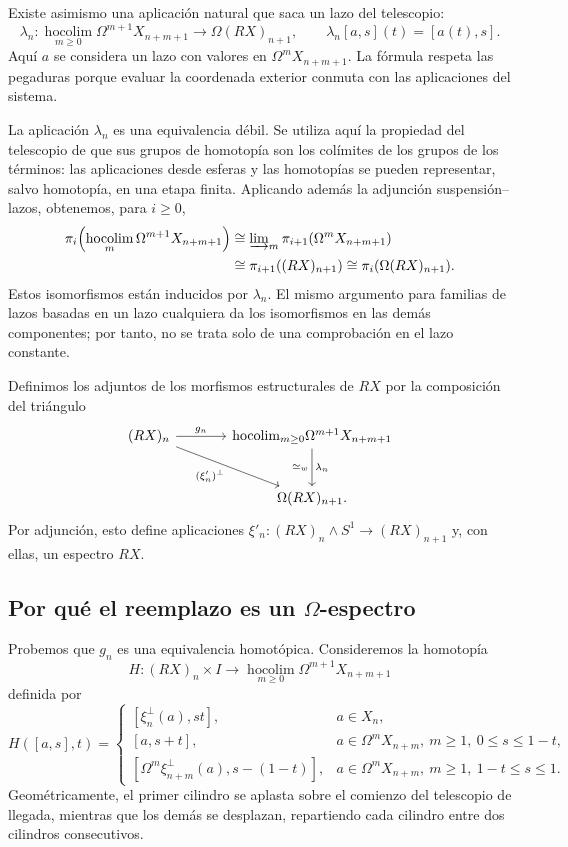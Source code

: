 Existe asimismo una aplicación natural que saca un lazo del telescopio:
\[
\lambda_n\colon
\operatorname*{hocolim}_{m\ge0}\Omega^{m+1}X_{n+m+1}
\longrightarrow\Omega(RX)_{n+1},
\qquad
\lambda_n[a,s](t)=[a(t),s].
\]
Aquí $a$ se considera un lazo con valores en $\Omega^mX_{n+m+1}$. La fórmula respeta las pegaduras porque evaluar la coordenada exterior conmuta con las aplicaciones del sistema.

La aplicación $\lambda_n$ es una equivalencia débil. Se utiliza aquí la propiedad del telescopio de que sus grupos de homotopía son los colímites de los grupos de los términos: las aplicaciones desde esferas y las homotopías se pueden representar, salvo homotopía, en una etapa finita. Aplicando además la adjunción suspensión--lazos, obtenemos, para $i\ge0$,
\[
\begin{aligned}
\pi_i\!\left(\operatorname*{hocolim}_m\Omega^{m+1}X_{n+m+1}\right)
&\cong\varinjlim\nolimits_m\pi_{i+1}(\Omega^mX_{n+m+1})\\
&\cong\pi_{i+1}((RX)_{n+1})
\cong\pi_i(\Omega(RX)_{n+1}).
\end{aligned}
\]
Estos isomorfismos están inducidos por $\lambda_n$. El mismo argumento para familias de lazos basadas en un lazo cualquiera da los isomorfismos en las demás componentes; por tanto, no se trata solo de una comprobación en el lazo constante.

Definimos los adjuntos de los morfismos estructurales de $RX$ por la composición del triángulo
\[
\begin{tikzcd}[column sep=large,row sep=large]
(RX)_n \arrow[r,"g_n"] \arrow[dr,"(\xi'_n)^{\perp}"']
& \smash[b]{\operatorname*{hocolim}_{m\ge0}}\Omega^{m+1}X_{n+m+1}
\arrow[d,"\lambda_n", "\simeq_w"']\\
& \Omega(RX)_{n+1}.
\end{tikzcd}
\]
Por adjunción, esto define aplicaciones $\xi'_n\colon(RX)_n\wedge S^1\to(RX)_{n+1}$ y, con ellas, un espectro $RX$.

\subsection{Por qué el reemplazo es un \texorpdfstring{$\Omega$}{Omega}-espectro}

Probemos que $g_n$ es una equivalencia homotópica. Consideremos la homotopía
\[
H\colon(RX)_n\times I\longrightarrow
\operatorname*{hocolim}_{m\ge0}\Omega^{m+1}X_{n+m+1}
\]
definida por
\[
H([a,s],t)=
\begin{cases}
[\xi_n^{\perp}(a),st],&a\in X_n,\\[2pt]
[a,s+t],&a\in\Omega^mX_{n+m},\ m\ge1,\ 0\le s\le1-t,\\[2pt]
[\Omega^m\xi_{n+m}^{\perp}(a),s-(1-t)],
&a\in\Omega^mX_{n+m},\ m\ge1,\ 1-t\le s\le1.
\end{cases}
\]
Geométricamente, el primer cilindro se aplasta sobre el comienzo del telescopio de llegada, mientras que los demás se desplazan, repartiendo cada cilindro entre dos cilindros consecutivos.


